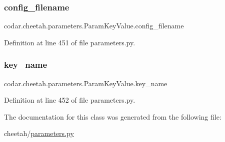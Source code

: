 \subsubsection{\texorpdfstring{config\+\_\+filename}{config\_filename}}
{\footnotesize\ttfamily codar.\+cheetah.\+parameters.\+Param\+Key\+Value.\+config\+\_\+filename}



Definition at line 451 of file parameters.\+py.

\mbox{\label{classcodar_1_1cheetah_1_1parameters_1_1_param_key_value_aed81003e4524c70ca0329433fa677f6c}} 
\subsubsection{\texorpdfstring{key\+\_\+name}{key\_name}}
{\footnotesize\ttfamily codar.\+cheetah.\+parameters.\+Param\+Key\+Value.\+key\+\_\+name}



Definition at line 452 of file parameters.\+py.



The documentation for this class was generated from the following file\+:\begin{DoxyCompactItemize}
\item 
cheetah/\hyperlink{parameters_8py}{parameters.\+py}\end{DoxyCompactItemize}

